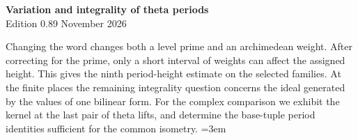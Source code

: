 \begin{center}
{\Large\bfseries Variation and integrality of theta periods}\\[4pt]
Edition 0.89  November 2026
\end{center}

Changing the word changes both a level prime and an archimedean
weight. After correcting for the prime, only a short interval of
weights can affect the assigned height. This gives the ninth
period-height estimate on the selected families.
At the finite places the remaining integrality question concerns the
ideal generated by the values of one bilinear form.
For the complex comparison we exhibit the kernel at the last pair
of theta lifts, and determine the base-tuple period identities
sufficient for the common isometry.
\begingroup\emergencystretch=3em





\endgroup
